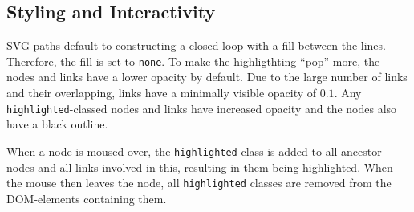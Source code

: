     \subsection{Styling and Interactivity}
    SVG-paths default to constructing a closed loop with a fill between the
    lines. Therefore, the fill is set to \texttt{none}. To make the
    highligthting ``pop'' more, the nodes and links have a lower opacity by
    default. Due to the large number of links and their overlapping, links have
    a minimally visible opacity of $0.1$. Any \texttt{highlighted}-classed nodes
    and links have increased opacity and the nodes also have a black outline.
    
    When a node is moused over, the \texttt{highlighted} class is added to all
    ancestor nodes and all links involved in this, resulting in them being
    highlighted. When the mouse then leaves the node, all
    \texttt{highlighted} classes are removed from the DOM-elements containing
    them.
